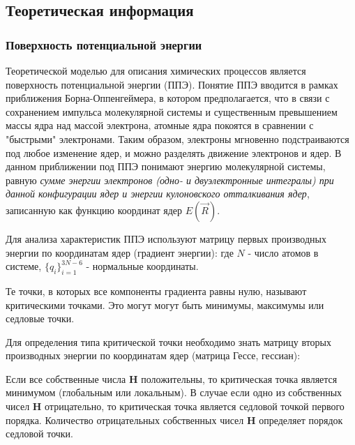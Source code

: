 \subsection{Теоретическая информация}
\subsubsection{Поверхность потенциальной энергии}
Теоретической моделью для описания химических процессов является поверхность потенциальной энергии (ППЭ). Понятие ППЭ вводится в рамках приближения Борна-Оппенгеймера, в котором предполагается, что в связи с сохранением импульса молекулярной системы и существенным превышением массы ядра над массой электрона, атомные ядра покоятся в сравнении с "быстрыми" электронами. Таким образом, электроны мгновенно подстраиваются под любое изменение ядер, и можно разделять движение электронов и ядер. В данном приближении под ППЭ понимают энергию молекулярной системы, равную \textit{сумме энергии электронов (одно- и двуэлектронные интегралы) при данной конфигурации ядер и энергии кулоновского отталкивания ядер}, записанную как функцию координат ядер $E(\vec{R})$. 

Для анализа характеристик ППЭ используют матрицу первых производных энергии по координатам ядер (градиент энергии):
где $N$ - число атомов в системе, $\{q_i\}_{i=1}^{3N-6}$ - нормальные координаты.

Те точки, в которых все компоненты градиента равны нулю, называют критическими точками. Это могут могут быть минимумы, максимумы или седловые точки. 

Для определения типа критической точки необходимо знать матрицу вторых производных энергии по координатам ядер (матрица Гессе, гессиан):

Если все собственные числа \textbf{H} положительны, то критическая точка является минимумом (глобальным или локальным). В случае если одно из собственных чисел \textbf{H} отрицательно, то критическая точка является седловой точкой первого порядка. Количество отрицательных собственных чисел \textbf{H} определяет порядок седловой точки.

